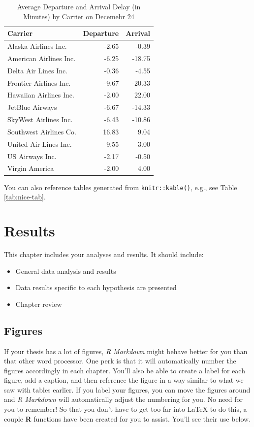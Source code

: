 \documentclass[12pt,letterpaper,oneside,oldfontcommands]{memoir}
\providecommand{\tightlist}{%
  \setlength{\itemsep}{0pt}\setlength{\parskip}{0pt}}
\theoremstyle{definition}
\theoremstyle{definition}
\theoremstyle{definition}
\theoremstyle{remark}
\begin{document}
\begin{table}

\caption{\label{tab:unnamed-chunk-3}Average Departure and Arrival Delay (in Minutes) by Carrier on Decemebr 24}
\centering
\begin{tabular}[t]{lrr}
\toprule
Carrier & Departure & Arrival\\
\midrule
Alaska Airlines Inc. & -2.65 & -0.39\\
American Airlines Inc. & -6.25 & -18.75\\
Delta Air Lines Inc. & -0.36 & -4.55\\
Frontier Airlines Inc. & -9.67 & -20.33\\
Hawaiian Airlines Inc. & -2.00 & 22.00\\
\addlinespace
JetBlue Airways & -6.67 & -14.33\\
SkyWest Airlines Inc. & -6.43 & -10.86\\
Southwest Airlines Co. & 16.83 & 9.04\\
United Air Lines Inc. & 9.55 & 3.00\\
US Airways Inc. & -2.17 & -0.50\\
Virgin America & -2.00 & 4.00\\
\bottomrule
\end{tabular}
\end{table}

You can also reference tables generated from \texttt{knitr::kable()},
e.g., see Table \ref{tab:nice-tab}.

\hypertarget{results}{%
\chapter{Results}\label{results}}

This chapter includes your analyses and results. It should include:

\begin{itemize}
\tightlist
\item
  General data analysis and results
\item
  Data results specific to each hypothesis are presented
\item
  Chapter review
\end{itemize}

\hypertarget{figures-1}{%
\section{Figures}\label{figures-1}}

If your thesis has a lot of figures, \emph{R Markdown} might behave
better for you than that other word processor. One perk is that it will
automatically number the figures accordingly in each chapter. You'll
also be able to create a label for each figure, add a caption, and then
reference the figure in a way similar to what we saw with tables
earlier. If you label your figures, you can move the figures around and
\emph{R Markdown} will automatically adjust the numbering for you. No
need for you to remember! So that you don't have to get too far into
LaTeX to do this, a couple \textbf{R} functions have been created for
you to assist. You'll see their use below.
\end{document}
